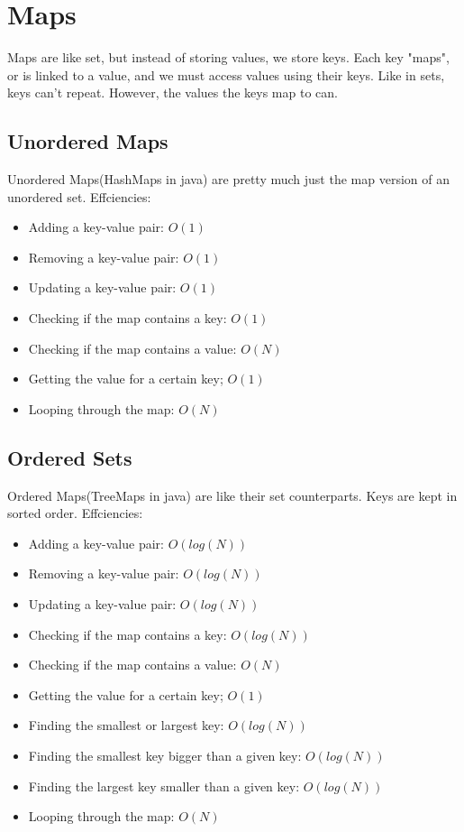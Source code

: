 \documentclass{article}
\begin{document}
\section{Maps}
    Maps are like set, but instead of storing values, we store keys. Each key "maps", or is linked to a value, and we must access values using their keys. Like in sets, keys can't repeat. However, the values the keys map to can.
\subsection{Unordered Maps}
    Unordered Maps(HashMaps in java) are pretty much just the map version of an unordered set.
    \newline 
    \newline
    Effciencies: 
    \begin{itemize}
        \item Adding a key-value pair: $O(1)$
        \item Removing a key-value pair: $O(1)$
        \item Updating a key-value pair: $O(1)$
        \item Checking if the map contains a key: $O(1)$
        \item Checking if the map contains a value: $O(N)$
        \item Getting the value for a certain key; $O(1)$
        \item Looping through the map: $O(N)$
    \end{itemize}
    
\subsection{Ordered Sets}
    Ordered Maps(TreeMaps in java) are like their set counterparts. Keys are kept in sorted order.
    \newline 
    \newline
    Effciencies: 
    \begin{itemize}
        \item Adding a key-value pair: $O(log(N))$
        \item Removing a key-value pair: $O(log(N))$
        \item Updating a key-value pair: $O(log(N))$
        \item Checking if the map contains a key: $O(log(N))$
        \item Checking if the map contains a value: $O(N)$
        \item Getting the value for a certain key; $O(1)$
        \item Finding the smallest or largest key: $O(log(N))$
        \item Finding the smallest key bigger than a given key: $O(log(N))$
        \item Finding the largest key smaller than a given key: $O(log(N))$
        \item Looping through the map: $O(N)$
    \end{itemize}
\end{document}
